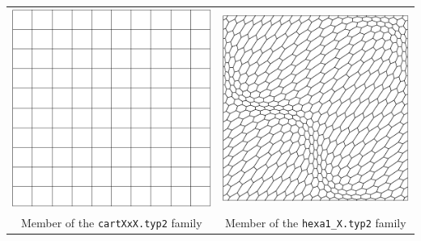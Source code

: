 \documentclass{article}
\begin{document}
\begin{center}
\begin{tabular}{cc}
\includegraphics[width=0.5\linewidth]{cart10x10.pdf} & \includegraphics[width=0.5\linewidth]{hexa1_2.pdf}\\
{Member of the \texttt{cartXxX.typ2} family} & {Member of the \texttt{hexa1\_X.typ2} family}
\end{tabular}
\end{center}
\end{document}
